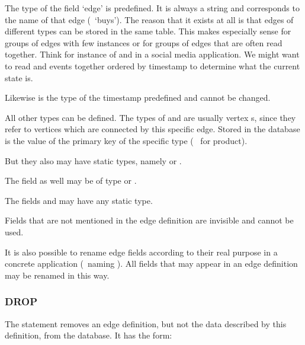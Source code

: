 The type of the field `edge' is predefined.
It is always a string and corresponds to the
name of that edge (\eg\ `buys').
The reason that it exists at all
is that edges of different types can be stored
in the same table.
This makes especially sense for groups of edges
with few instances or for groups of edges
that are often read together.
Think for instance of  and 
in a social media application.
We might want to read  and 
events together ordered by timestamp to determine
what the current state is.

Likewise is the type of the timestamp predefined
and cannot be changed.

All other types can be defined.
The types of  and 
are usually vertex s, since they refer
to vertices which are connected by this specific edge.
Stored in the database is the value of the primary key
of the specific type (\ie\  for product).

But they also may have static types, namely
 or .

The field  as well may be of type
 or .

The fields  and 
may have any static type.

Fields that are not mentioned in the edge definition
are invisible and cannot be used.


It is also possible to rename edge fields
according to their real purpose in a concrete
application (\eg\ naming  ).
All fields that may appear in an edge definition
may be renamed in this way.

\subsubsection{DROP}
The  statement removes an edge definition,
but not the data described by this definition,
from the database.
It has the form:

